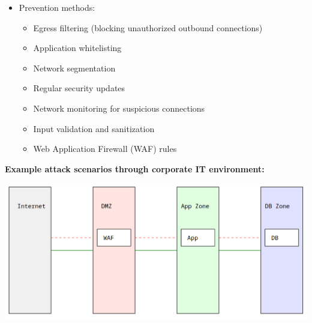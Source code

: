 \begin{itemize}
	\item Prevention methods:
    \begin{itemize}
        \tightlist
		\item Egress filtering (blocking unauthorized outbound connections)
		\item Application whitelisting
		\item Network segmentation
		\item Regular security updates
		\item Network monitoring for suspicious connections
		\item Input validation and sanitization
		\item Web Application Firewall (WAF) rules
    \end{itemize}
\end{itemize}

\textbf{Example attack scenarios through corporate IT environment:}
\begin{center}
    \includegraphics[scale=0.4]{resources/02-tcp-ip-sw-attack.png}
\end{center}

